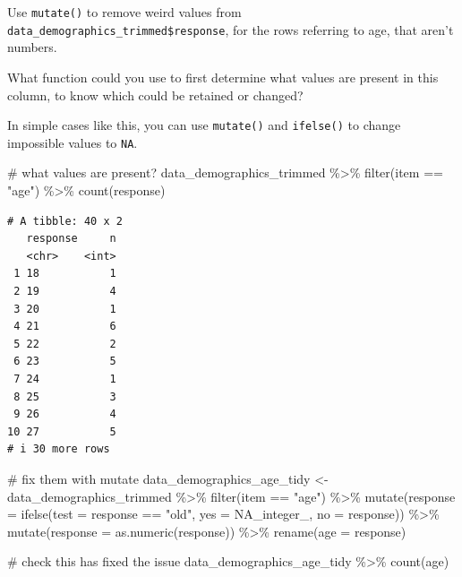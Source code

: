 \documentclass[
  letterpaper,
  DIV=11,
  numbers=noendperiod]{scrreprt}
\newenvironment{Shaded}{\begin{snugshade}}{\end{snugshade}}
\newcommand{\AttributeTok}[1]{\textcolor[rgb]{0.40,0.45,0.13}{#1}}
\newcommand{\CommentTok}[1]{\textcolor[rgb]{0.37,0.37,0.37}{#1}}
\newcommand{\ConstantTok}[1]{\textcolor[rgb]{0.56,0.35,0.01}{#1}}
\newcommand{\FunctionTok}[1]{\textcolor[rgb]{0.28,0.35,0.67}{#1}}
\newcommand{\NormalTok}[1]{\textcolor[rgb]{0.00,0.23,0.31}{#1}}
\newcommand{\OtherTok}[1]{\textcolor[rgb]{0.00,0.23,0.31}{#1}}
\newcommand{\SpecialCharTok}[1]{\textcolor[rgb]{0.37,0.37,0.37}{#1}}
\newcommand{\StringTok}[1]{\textcolor[rgb]{0.13,0.47,0.30}{#1}}
\begin{document}
Use \texttt{mutate()} to remove weird values from
\texttt{data\_demographics\_trimmed\$response}, for the rows referring
to age, that aren't numbers.

What function could you use to first determine what values are present
in this column, to know which could be retained or changed?

In simple cases like this, you can use \texttt{mutate()} and
\texttt{ifelse()} to change impossible values to \texttt{NA}.

\begin{Shaded}
\begin{Highlighting}[]
\CommentTok{\# what values are present?}
\NormalTok{data\_demographics\_trimmed }\SpecialCharTok{\%\textgreater{}\%}
  \FunctionTok{filter}\NormalTok{(item }\SpecialCharTok{==} \StringTok{"age"}\NormalTok{) }\SpecialCharTok{\%\textgreater{}\%}
  \FunctionTok{count}\NormalTok{(response) }
\end{Highlighting}
\end{Shaded}

\begin{verbatim}
# A tibble: 40 x 2
   response     n
   <chr>    <int>
 1 18           1
 2 19           4
 3 20           1
 4 21           6
 5 22           2
 6 23           5
 7 24           1
 8 25           3
 9 26           4
10 27           5
# i 30 more rows
\end{verbatim}

\begin{Shaded}
\begin{Highlighting}[]
\CommentTok{\# fix them with mutate}
\NormalTok{data\_demographics\_age\_tidy }\OtherTok{\textless{}{-}}\NormalTok{ data\_demographics\_trimmed }\SpecialCharTok{\%\textgreater{}\%}
  \FunctionTok{filter}\NormalTok{(item }\SpecialCharTok{==} \StringTok{"age"}\NormalTok{) }\SpecialCharTok{\%\textgreater{}\%}
  \FunctionTok{mutate}\NormalTok{(}\AttributeTok{response =} \FunctionTok{ifelse}\NormalTok{(}\AttributeTok{test =}\NormalTok{ response }\SpecialCharTok{==} \StringTok{"old"}\NormalTok{,}
                           \AttributeTok{yes =} \ConstantTok{NA\_integer\_}\NormalTok{,}
                           \AttributeTok{no =}\NormalTok{ response)) }\SpecialCharTok{\%\textgreater{}\%}
  \FunctionTok{mutate}\NormalTok{(}\AttributeTok{response =} \FunctionTok{as.numeric}\NormalTok{(response)) }\SpecialCharTok{\%\textgreater{}\%}
  \FunctionTok{rename}\NormalTok{(}\AttributeTok{age =}\NormalTok{ response)}

\CommentTok{\# check this has fixed the issue}
\NormalTok{data\_demographics\_age\_tidy }\SpecialCharTok{\%\textgreater{}\%}
  \FunctionTok{count}\NormalTok{(age)}
\end{Highlighting}
\end{Shaded}
\end{document}

